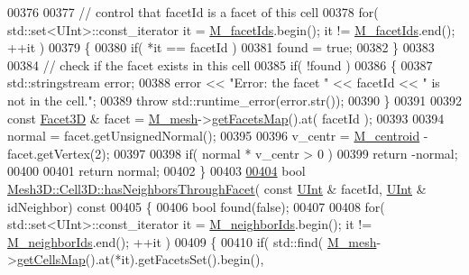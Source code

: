 \begin{DoxyCode}
00376 
00377     \textcolor{comment}{// control that facetId is a facet of this cell}
00378     \textcolor{keywordflow}{for}( std::set<UInt>::const\_iterator it = \hyperlink{classFVCode3D_1_1Mesh3D_1_1Cell3D_a1aa6b2a5119a2b94946f9a7dcfcb9478}{M\_facetIds}.begin(); it != 
      \hyperlink{classFVCode3D_1_1Mesh3D_1_1Cell3D_a1aa6b2a5119a2b94946f9a7dcfcb9478}{M\_facetIds}.end(); ++it )
00379     \{
00380         \textcolor{keywordflow}{if}( *it == facetId )
00381             found = \textcolor{keyword}{true};
00382     \}
00383 
00384     \textcolor{comment}{// check if the facet exists in this cell}
00385     \textcolor{keywordflow}{if}( !found )
00386     \{
00387         std::stringstream error;
00388         error << \textcolor{stringliteral}{"Error: the facet "} << facetId << \textcolor{stringliteral}{" is not in the cell."};
00389         \textcolor{keywordflow}{throw} std::runtime\_error(error.str());
00390     \}
00391 
00392     \textcolor{keyword}{const} \hyperlink{classFVCode3D_1_1Mesh3D_1_1Facet3D}{Facet3D} & facet = \hyperlink{classFVCode3D_1_1Mesh3D_1_1Cell3D_a5f593479ad61eb1a043b7ec977db39bb}{M\_mesh}->\hyperlink{classFVCode3D_1_1Mesh3D_a76de387da2a552e3e1210d795bc7acf9}{getFacetsMap}().at( facetId );
00393 
00394     normal = facet.getUnsignedNormal();
00395 
00396     v\_centr = \hyperlink{classFVCode3D_1_1Mesh3D_1_1Cell3D_a85077932a074f0903d085f9d33a13e09}{M\_centroid} - facet.getVertex(2);
00397 
00398     \textcolor{keywordflow}{if}( normal * v\_centr > 0 )
00399         \textcolor{keywordflow}{return} -normal;
00400 
00401     \textcolor{keywordflow}{return} normal;
00402 \}
00403 
\hypertarget{Mesh3D_8cpp_source.tex_l00404}{}\hyperlink{classFVCode3D_1_1Mesh3D_1_1Cell3D_ab398572491821d827c2324b340e05c10}{00404} \textcolor{keywordtype}{bool} \hyperlink{classFVCode3D_1_1Mesh3D_1_1Cell3D_ab398572491821d827c2324b340e05c10}{Mesh3D::Cell3D::hasNeighborsThroughFacet}( \textcolor{keyword}{const} 
      \hyperlink{namespaceFVCode3D_a4bf7e328c75d0fd504050d040ebe9eda}{UInt} & facetId, \hyperlink{namespaceFVCode3D_a4bf7e328c75d0fd504050d040ebe9eda}{UInt} & idNeighbor)\textcolor{keyword}{ const}
00405 \textcolor{keyword}{}\{
00406     \textcolor{keywordtype}{bool} found(\textcolor{keyword}{false});
00407 
00408     \textcolor{keywordflow}{for}( std::set<UInt>::const\_iterator it = \hyperlink{classFVCode3D_1_1Mesh3D_1_1Cell3D_ab05458f242974547b2657d0806fc3daa}{M\_neighborIds}.begin(); it != 
      \hyperlink{classFVCode3D_1_1Mesh3D_1_1Cell3D_ab05458f242974547b2657d0806fc3daa}{M\_neighborIds}.end(); ++it )
00409     \{
00410         \textcolor{keywordflow}{if}( std::find( \hyperlink{classFVCode3D_1_1Mesh3D_1_1Cell3D_a5f593479ad61eb1a043b7ec977db39bb}{M\_mesh}->\hyperlink{classFVCode3D_1_1Mesh3D_ad904ef5e068c89951d77e9364e960bf3}{getCellsMap}().at(*it).getFacetsSet().begin(), 

\end{DoxyCode}
